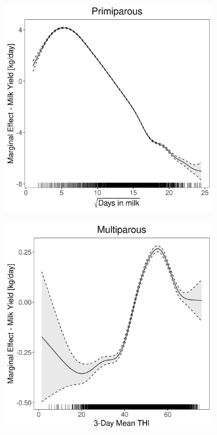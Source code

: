 \begin{figure}[H]
\begin{subfigure}[b]{0.45\textwidth}
    \end{subfigure}
    \hspace{0.05\textwidth} %
    \begin{subfigure}[b]{0.45\textwidth}
        \centering
        \includegraphics[width=\textwidth]{thesis/figures/models/milk/after2010/si_milk_after2010/si_milk_after2010_marginal_dim_milk_primi.png}
    \end{subfigure}
    \begin{subfigure}[b]{0.45\textwidth}
        \centering
        \includegraphics[width=\textwidth]{thesis/figures/models/milk/after2010/si_milk_after2010/si_milk_after2010_marginal_thi_milk_multi.png}

\end{subfigure}
\end{figure}

